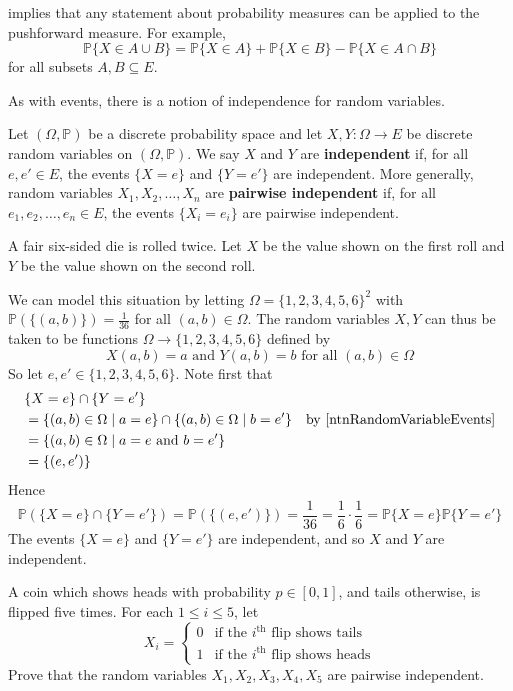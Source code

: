  implies that any statement about probability measures can be applied to the pushforward measure. For example,
\[ \mathbb{P}\{X \in A \cup B\} = \mathbb{P}\{X \in A\} + \mathbb{P}\{X \in B\} - \mathbb{P}\{X \in A \cap B\} \]
for all subsets $A,B \subseteq E$.

As with events, there is a notion of independence for random variables.

\begin{definition}
\label{defIndependentRandomVariables}
Let $(\Omega,\mathbb{P})$ be a discrete probability space and let $X,Y : \Omega \to E$ be discrete random variables on $(\Omega,\mathbb{P})$. We say $X$ and $Y$ are \textbf{independent} if, for all $e,e' \in E$, the events $\{ X=e \}$ and $\{ Y=e' \}$ are independent. More generally, random variables $X_1,X_2,\dots,X_n$ are \textbf{pairwise independent} if, for all $e_1,e_2,\dots,e_n \in E$, the events $\{ X_i = e_i \}$ are pairwise independent.
\end{definition}

\begin{example}
A fair six-sided die is rolled twice. Let $X$ be the value shown on the first roll and $Y$ be the value shown on the second roll.

We can model this situation by letting $\Omega = \{ 1, 2, 3, 4, 5, 6 \}^2$ with $\mathbb{P}(\{(a,b)\})=\frac{1}{36}$ for all $(a,b) \in \Omega$. The random variables $X,Y$ can thus be taken to be functions $\Omega \to \{ 1, 2, 3, 4, 5, 6 \}$ defined by
\[ X(a,b)=a \text{ and } Y(a,b)=b \text{ for all } (a,b) \in \Omega \]
So let $e,e' \in \{ 1, 2, 3, 4, 5, 6 \}$. Note first that
\begin{align*}
& \{ X = e \} \cap \{ Y = e' \} && \\
&= \{ (a,b) \in \Omega \mid a=e \} \cap \{ (a,b) \in \Omega \mid b=e' \} && \text{by \Cref{ntnRandomVariableEvents}} \\
&= \{ (a,b) \in \Omega \mid a=e \text{ and } b=e' \} && \\
&= \{ (e,e') \} &&
\end{align*}
Hence
\[ \mathbb{P}(\{ X = e \} \cap \{ Y = e' \}) = \mathbb{P}(\{(e,e')\}) = \frac{1}{36} = \frac{1}{6} \cdot \frac{1}{6} = \mathbb{P}\{X=e\}\mathbb{P}\{Y=e'\} \]
The events $\{ X = e \}$ and $\{ Y = e' \}$ are independent, and so $X$ and $Y$ are independent.
\end{example}

\begin{exercise}
A coin which shows heads with probability $p \in [0,1]$, and tails otherwise, is flipped five times. For each $1 \le i \le 5$, let
\[ X_i = \begin{cases} 0 & \text{if the } i^{\text{th}} \text{ flip shows tails} \\
1 & \text{if the } i^{\text{th}} \text{ flip shows heads} \end{cases} \]
Prove that the random variables $X_1,X_2,X_3,X_4,X_5$ are pairwise independent.
\end{exercise}

